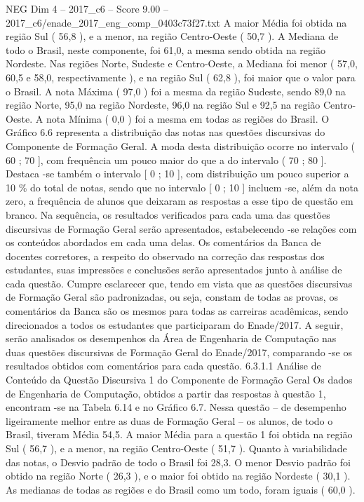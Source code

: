 \begin{textsample}{NEG Dim 4 – 2017\_c6 – Score 9.00 – 2017\_c6/enade\_2017\_eng\_comp\_0403c73f27.txt}
A maior Média foi obtida na região Sul ( 56,8 ), e a menor, na região Centro-Oeste ( 50,7 ).
A Mediana de todo o Brasil, neste componente, foi 61,0, a mesma sendo obtida na região Nordeste.
Nas regiões Norte, Sudeste e Centro-Oeste, a Mediana foi menor ( 57,0, 60,5 e 58,0, respectivamente ), e na região Sul ( 62,8 ), foi maior que o valor para o Brasil.
A nota Máxima ( 97,0 ) foi a mesma da região Sudeste, sendo 89,0 na região Norte, 95,0 na região Nordeste, 96,0 na região Sul e 92,5 na região Centro-Oeste.
A nota Mínima ( 0,0 ) foi a mesma em todas as regiões do Brasil.
O Gráfico 6.6 representa a distribuição das notas nas questões discursivas do Componente de Formação Geral.
A moda desta distribuição ocorre no intervalo ( 60 ; 70 ], com frequência um pouco maior do que a do intervalo ( 70 ; 80 ].
Destaca -se também o intervalo [ 0 ; 10 ], com distribuição um pouco superior a 10 \% do total de notas, sendo que no intervalo [ 0 ; 10 ] incluem -se, além da nota zero, a frequência de alunos que deixaram as respostas a esse tipo de questão em branco.
Na sequência, os resultados verificados para cada uma das questões discursivas de Formação Geral serão apresentados, estabelecendo -se relações com os conteúdos abordados em cada uma delas.
Os comentários da Banca de docentes corretores, a respeito do observado na correção das respostas dos estudantes, suas impressões e conclusões serão apresentados junto à análise de cada questão.
Cumpre esclarecer que, tendo em vista que as questões discursivas de Formação Geral são padronizadas, ou seja, constam de todas as provas, os comentários da Banca são os mesmos para todas as carreiras acadêmicas, sendo direcionados a todos os estudantes que participaram do Enade/2017.
A seguir, serão analisados os desempenhos da Área de Engenharia de Computação nas duas questões discursivas de Formação Geral do Enade/2017, comparando -se os resultados obtidos com comentários para cada questão. 6.3.1.1 Análise de Conteúdo da Questão Discursiva 1 do Componente de Formação Geral Os dados de Engenharia de Computação, obtidos a partir das respostas à questão 1, encontram -se na Tabela 6.14 e no Gráfico 6.7.
Nessa questão – de desempenho ligeiramente melhor entre as duas de Formação Geral – os alunos, de todo o Brasil, tiveram Média 54,5.
A maior Média para a questão 1 foi obtida na região Sul ( 56,7 ), e a menor, na região Centro-Oeste ( 51,7 ).
Quanto à variabilidade das notas, o Desvio padrão de todo o Brasil foi 28,3.
O menor Desvio padrão foi obtido na região Norte ( 26,3 ), e o maior foi obtido na região Nordeste ( 30,1 ).
As medianas de todas as regiões e do Brasil como um todo, foram iguais ( 60,0 ).

\end{textsample}
